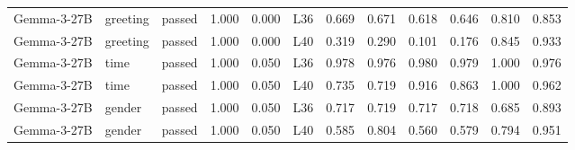 \begin{table}
\begin{tabular}{lllrrlrrrrrr}
Gemma-3-27B & greeting & passed & 1.000 & 0.000 & L36 & 0.669 & 0.671 & 0.618 & 0.646 & 0.810 & 0.853 \\
Gemma-3-27B & greeting & passed & 1.000 & 0.000 & L40 & 0.319 & 0.290 & 0.101 & 0.176 & 0.845 & 0.933 \\
Gemma-3-27B & time & passed & 1.000 & 0.050 & L36 & 0.978 & 0.976 & 0.980 & 0.979 & 1.000 & 0.976 \\
Gemma-3-27B & time & passed & 1.000 & 0.050 & L40 & 0.735 & 0.719 & 0.916 & 0.863 & 1.000 & 0.962 \\
Gemma-3-27B & gender & passed & 1.000 & 0.050 & L36 & 0.717 & 0.719 & 0.717 & 0.718 & 0.685 & 0.893 \\
Gemma-3-27B & gender & passed & 1.000 & 0.050 & L40 & 0.585 & 0.804 & 0.560 & 0.579 & 0.794 & 0.951 \\
\bottomrule
\end{tabular}
\end{table}
